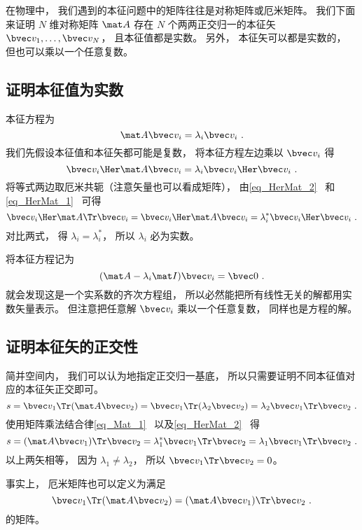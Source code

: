 
\begin{issues}
\issueTODO
\end{issues}


在物理中， 我们遇到的本征问题中的矩阵往往是对称矩阵或厄米矩阵。 %
我们下面来证明 $N$ 维对称矩阵 $\mat A$ 存在 $N$ 个两两正交归一的本征矢 $\bvec v_1, \dots, \bvec v_N$， 且本征值都是实数。 另外， 本征矢可以都是实数的， 但也可以乘以一个任意复数。


\subsection{证明本征值为实数}
本征方程为
\begin{equation}
\mat A \bvec v_i = \lambda_i \bvec v_i~.
\end{equation}
我们先假设本征值和本征矢都可能是复数， 将本征方程左边乘以 $\bvec v_i$ 得
\begin{equation}
\bvec v_i\Her \mat A \bvec v_i = \lambda_i \bvec v_i\Her \bvec v_i~.
\end{equation}
将等式两边取厄米共轭（注意矢量也可以看成矩阵）， 由\autoref{eq_HerMat_2}~ 和\autoref{eq_HerMat_1}~ 可得
\begin{equation}
\bvec v_i\Her \mat A\Tr \bvec v_i = \bvec v_i\Her \mat A \bvec v_i = \lambda_i^* \bvec v_i\Her \bvec v_i~.
\end{equation}
对比两式， 得 $\lambda_i = \lambda_i^*$， 所以 $\lambda_i$ 必为实数。

将本征方程记为
\begin{equation}
(\mat A - \lambda_i\mat I)\bvec v_i = \bvec 0~.
\end{equation}
就会发现这是一个实系数的齐次方程组， 所以必然能把所有线性无关的解都用实数矢量表示。 但注意把任意解 $\bvec v_i$ 乘以一个任意复数， 同样也是方程的解。

\subsection{证明本征矢的正交性}
简并空间内， 我们可以认为地指定正交归一基底， 所以只需要证明不同本征值对应的本征矢正交即可。
\begin{equation}
s = \bvec v_1\Tr (\mat A \bvec v_2) = \bvec v_1\Tr (\lambda_2 \bvec v_2) = \lambda_2 \bvec v_1\Tr \bvec v_2~.
\end{equation}
使用矩阵乘法结合律\autoref{eq_Mat_1}~ 以及\autoref{eq_HerMat_2}~ 得
\begin{equation}
s = (\mat A \bvec v_1)\Tr \bvec v_2 = \lambda_1^* \bvec v_1\Tr \bvec v_2 = \lambda_1 \bvec v_1\Tr \bvec v_2~.
\end{equation}
以上两矢相等， 因为 $\lambda_1 \ne \lambda_2$， 所以 $\bvec v_1\Tr \bvec v_2 = 0$。

事实上， 厄米矩阵也可以定义为满足
\begin{equation}
\bvec v_1\Tr (\mat A \bvec v_2) = (\mat A \bvec v_1)\Tr \bvec v_2~.
\end{equation}
的矩阵。
